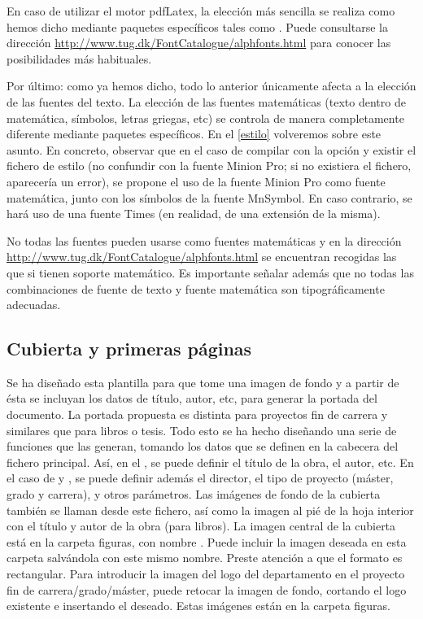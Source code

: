 En caso de utilizar el motor pdfLatex, la elección más sencilla se realiza como hemos dicho mediante paquetes específicos tales como . Puede consultarse la dirección \url{http://www.tug.dk/FontCatalogue/alphfonts.html} para conocer las posibilidades más habituales. 

Por último: como ya hemos dicho, todo lo anterior únicamente afecta a la elección de las fuentes del texto. La elección de las fuentes matemáticas (texto dentro de matemática, símbolos, letras griegas, etc) se controla de manera completamente diferente mediante paquetes específicos. En el \autoref{estilo} volveremos sobre este asunto. En concreto, observar que en el caso de compilar con la opción  y existir el fichero de estilo  (no confundir con la fuente Minion Pro; si no existiera el fichero, aparecería un error), se propone el uso de la fuente Minion Pro como fuente matemática, junto con los símbolos de la fuente MnSymbol. En caso contrario, se hará uso de una fuente Times (en realidad, de una extensión de la misma). 

No todas las fuentes pueden usarse como fuentes matemáticas y en la dirección \url{http://www.tug.dk/FontCatalogue/alphfonts.html} se encuentran recogidas las que si tienen soporte matemático. Es importante señalar además que no todas las combinaciones de fuente de texto y fuente matemática son tipográficamente adecuadas. 

\subsection{Cubierta y primeras páginas}
Se ha diseñado esta plantilla para que tome una imagen de fondo y a partir de ésta se incluyan los datos de título, autor, etc, para generar la portada del documento. La portada propuesta es distinta para proyectos fin de carrera y similares que para libros o tesis. Todo esto se ha hecho diseñando una serie de funciones que las generan, tomando los datos que se definen en la cabecera del fichero principal. Así, en el , se puede definir el título de la obra, el autor, etc. En el caso de  y , se puede definir además el director, el tipo de proyecto (máster, grado y carrera), y otros parámetros. Las imágenes de fondo de la cubierta también se llaman desde este fichero, así como la imagen al pié de la hoja interior con el título y autor de la obra (para libros). La imagen central de la cubierta está en la carpeta figuras, con nombre . Puede incluir la imagen deseada en esta carpeta salvándola con este mismo nombre. Preste atención a que el formato es rectangular. Para introducir la imagen del logo del departamento en el proyecto fin de carrera/grado/máster, puede retocar la imagen de fondo, cortando el logo existente e insertando el deseado. Estas imágenes están en la carpeta figuras. 

